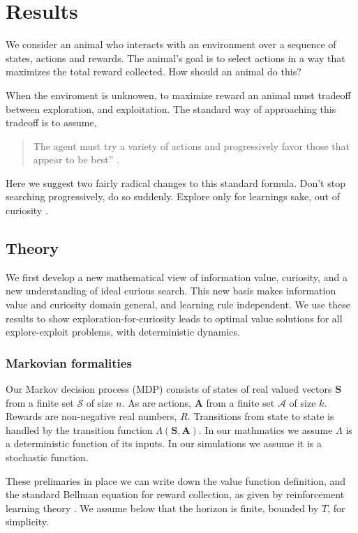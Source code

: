 \section*{Results} 
We consider an animal who interacts with an environment over a sequence of states, actions and rewards. The animal's goal is to select actions in a way that maximizes the total reward collected. How should an animal do this? 

When the enviroment is unknowen, to maximize reward an animal must tradeoff between exploration, and exploitation. The standard way of approaching this tradeoff is to assume, 

\begin{quote}
The agent must try a variety of actions and progressively favor those that appear to be best'' \cite{Sutton2018}. 
\end{quote}

Here we suggest two fairly radical changes to this standard formula. Don’t stop searching progressively, do so suddenly. Explore only for learnings sake, out of curiosity \citep{Kidd2015}. 

\subsection*{Theory}
We first develop a new mathematical view of information value, curiosity, and a new understanding of ideal curious search. This new basis makes information value and curiosity domain general, and learning rule independent. We use these results to show exploration-for-curiosity leads to optimal value solutions for all explore-exploit problems, with deterministic dynamics.

\subsubsection*{Markovian formalities}
Our Markov decision process (MDP) consists of states of real valued vectors $\mathbf{S}$ from a finite set $\mathcal{S}$ of size $n$. As are actions, $\mathbf{A}$ from a finite set $\mathcal{A}$ of size $k$. Rewards are non-negative real numbers, $R$. Transitions from state to state is handled by the transition function $\Lambda(\mathbf{S},\mathbf{A})$. In our mathmatics we assume $\Lambda$ is a deterministic function of its inputs. In our simulations we assume it is a stochastic function.

These prelimaries in place we can write down the value function definition, and the standard Bellman equation \cite{Bellmann1954} for reward collection, as given by reinforcement learning theory \citep{Sutton2018}. We assume below that the horizon is finite, bounded by $T$, for simplicity.

